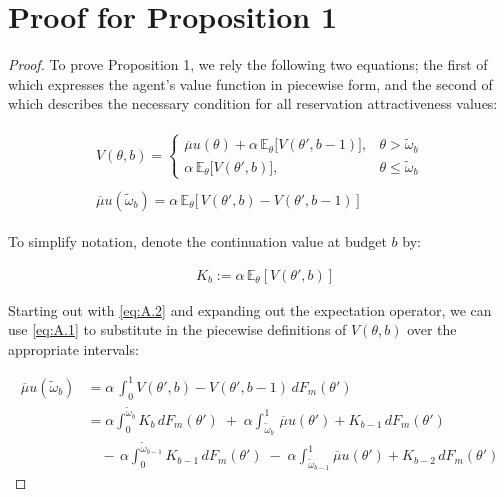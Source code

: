 \section{Proof for Proposition 1}
\label{appx: b} 
\begin{proof}
To prove Proposition 1, we rely the following two equations; the first of which expresses the agent's value function in piecewise form, and the second of which describes the necessary condition for all reservation attractiveness values:

\begin{align}
    \begin{split}\label{eq:A.1}
        V(\theta, b)=\begin{cases} 
            \overline\mu u(\theta) +\alpha \,\mathbb{E}_{\theta}\Big[V(\theta', b-1)\Big],& \theta> \widetilde \omega_b \\[10pt]
            \alpha \,\mathbb{E}_{\theta}\Big[V(\theta', b)\Big],& \theta\leq\widetilde \omega_b
        \end{cases}
    \end{split}\\[10pt]
    \begin{split}\label{eq:A.2}
        \overline\mu u(\widetilde\omega_b) = \alpha \, \mathbb{E}_\theta\Big[\,V(\theta',b)-V(\theta',b-1)\,\Big] 
    \end{split} 
\end{align} 
 
To simplify notation, denote the continuation value at budget $b$ by:

\begin{equation*}
    \begin{aligned}
        &K_{b}:=\alpha \,\mathbb{E}_{\theta}\left[V(\theta', b)\right] 
    \end{aligned} 
\end{equation*}

Starting out with \autoref{eq:A.2} and expanding out the expectation operator, we can use \ref{eq:A.1} to substitute in the piecewise definitions of $V(\theta,b)$ over the appropriate intervals:

\begin{equation}\label{eq:A.3}
    \begin{split}
        \overline\mu u(\widetilde\omega_b) &= \alpha \,\int^1_0 V(\theta',b)-V(\theta',b-1)\,dF_m(\theta')\\
                                           &=\alpha \int^{\widetilde\omega_b}_0 K_b\,dF_m(\theta') \;+\; \alpha \int^1_{\widetilde\omega_b}\,\overline\mu u(\theta') + K_{b-1}\,dF_m(\theta')\\ 
                                           & \quad -\,\alpha \int^{\widetilde\omega_{b-1}}_0 K_{b-1}\,dF_m(\theta') \;-\; \alpha \int^1_{\widetilde\omega_{b-1}} \overline\mu u(\theta') + K_{b-2}\,dF_m(\theta')
    \end{split}
\end{equation}


\end{proof}
